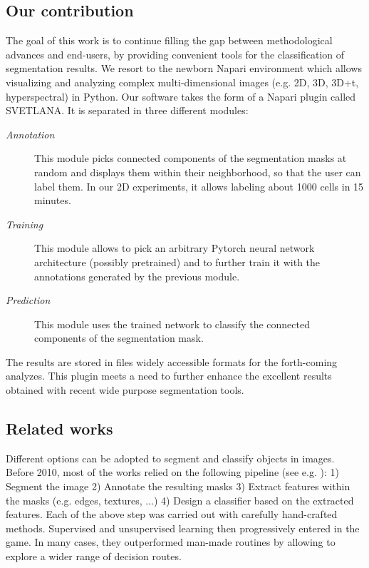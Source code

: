 \documentclass{article}
\begin{document}
\subsection{Our contribution}

The goal of this work is to continue filling the gap between methodological advances and end-users, by providing convenient tools for the classification of segmentation results. 
We resort to the newborn Napari environment \cite{perkel2021python} which allows visualizing and analyzing complex multi-dimensional images (e.g. 2D, 3D, 3D+t, hyperspectral) in Python.
Our software takes the form of a Napari plugin called SVETLANA. 
It is separated in three different modules: 
\begin{description}
  \item[\emph{Annotation}] This module picks connected components of the segmentation masks at random and displays them within their neighborhood, so that the user can label them. In our 2D experiments, it allows labeling about 1000 cells in 15 minutes.
  \item[\emph{Training}] This module allows to pick an arbitrary Pytorch \cite{paszke2019pytorch} neural network architecture (possibly pretrained) and to further train it with the annotations generated by the previous module.
  \item[\emph{Prediction}] This module uses the trained network to classify the connected components of the segmentation mask.
\end{description}
The results are stored in files widely accessible formats for the forth-coming analyzes. This plugin meets a need to further enhance the excellent results obtained with recent wide purpose segmentation tools.

\subsection{Related works}

Different options can be adopted to segment and classify objects in images. 
Before 2010, most of the works relied on the following pipeline (see e.g. \cite{irshad2013methods}): 1) Segment the image 2) Annotate the resulting masks 3) Extract features within the masks (e.g. edges, textures, ...) 4) Design a classifier based on the extracted features. 
Each of the above step was carried out with carefully hand-crafted methods. 
Supervised and unsupervised learning then progressively entered in the game. 
In many cases, they outperformed man-made routines by allowing to explore a wider range of decision routes. 
\end{document}
